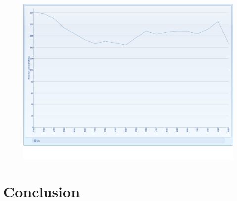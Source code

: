 \documentclass{article}
\begin{document}
\begin{figure}[htbp]
\begin{center}
\includegraphics[width=13cm,keepaspectratio=true]{figures/Expansion/EmissionTax/Co2ProductionET}
\caption{}
\label{fig:Co2ProductionET}
\end{center}
\end{figure}




\section{Conclusion}
\end{document}
